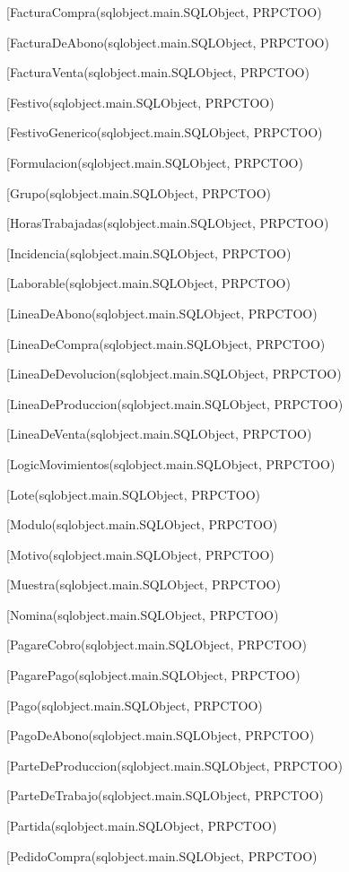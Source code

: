 \begin{description}
\begin{description}
\item[FacturaCompra(sqlobject.main.SQLObject, PRPCTOO)
\item[FacturaDeAbono(sqlobject.main.SQLObject, PRPCTOO)
\item[FacturaVenta(sqlobject.main.SQLObject, PRPCTOO)
\item[Festivo(sqlobject.main.SQLObject, PRPCTOO)
\item[FestivoGenerico(sqlobject.main.SQLObject, PRPCTOO)
\item[Formulacion(sqlobject.main.SQLObject, PRPCTOO)
\item[Grupo(sqlobject.main.SQLObject, PRPCTOO)
\item[HorasTrabajadas(sqlobject.main.SQLObject, PRPCTOO)
\item[Incidencia(sqlobject.main.SQLObject, PRPCTOO)
\item[Laborable(sqlobject.main.SQLObject, PRPCTOO)
\item[LineaDeAbono(sqlobject.main.SQLObject, PRPCTOO)
\item[LineaDeCompra(sqlobject.main.SQLObject, PRPCTOO)
\item[LineaDeDevolucion(sqlobject.main.SQLObject, PRPCTOO)
\item[LineaDeProduccion(sqlobject.main.SQLObject, PRPCTOO)
\item[LineaDeVenta(sqlobject.main.SQLObject, PRPCTOO)
\item[LogicMovimientos(sqlobject.main.SQLObject, PRPCTOO)
\item[Lote(sqlobject.main.SQLObject, PRPCTOO)
\item[Modulo(sqlobject.main.SQLObject, PRPCTOO)
\item[Motivo(sqlobject.main.SQLObject, PRPCTOO)
\item[Muestra(sqlobject.main.SQLObject, PRPCTOO)
\item[Nomina(sqlobject.main.SQLObject, PRPCTOO)
\item[PagareCobro(sqlobject.main.SQLObject, PRPCTOO)
\item[PagarePago(sqlobject.main.SQLObject, PRPCTOO)
\item[Pago(sqlobject.main.SQLObject, PRPCTOO)
\item[PagoDeAbono(sqlobject.main.SQLObject, PRPCTOO)
\item[ParteDeProduccion(sqlobject.main.SQLObject, PRPCTOO)
\item[ParteDeTrabajo(sqlobject.main.SQLObject, PRPCTOO)
\item[Partida(sqlobject.main.SQLObject, PRPCTOO)
\item[PedidoCompra(sqlobject.main.SQLObject, PRPCTOO)

\end{description}
\end{description}
